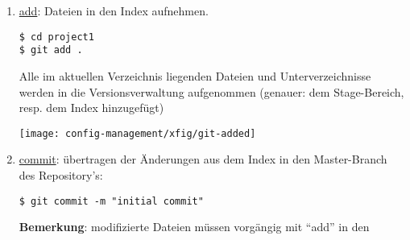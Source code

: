 \begin{enumerate}
Ein leeres, lokales Repository im aktuellen Verzeichnis einrichten:
  \begin{lstlisting}
$ cd /home/user/projects
$ git init project1
Initialized empty Git repository in /home/user/projects/project1/.git
  \end{lstlisting}
\begin{center}
\texttt{[image: config-management/git-repository-files]}
\end{center}
%
{\bfseries Bemerkung:} Um ein lokales Repository aus einem bereits existierenden
zu erzeugen, muss anstelle von ``init'' der Befehl ``clone'' verwendet
werden:
\begin{lstlisting}
$ git clone file:///var/git/project1.git
\end{lstlisting}
%
\newslide
\item \underline{add}: Dateien in den Index aufnehmen.
  \begin{lstlisting}
$ cd project1
$ git add .
  \end{lstlisting}
Alle im aktuellen Verzeichnis liegenden Dateien und Unterverzeichnisse
werden in die Versionsverwaltung aufgenommen (genauer: dem
Stage-Bereich, resp. dem Index hinzugefügt)
%
\newslide
\begin{center}
\texttt{[image: config-management/xfig/git-added]}
\end{center}
\newslide
\item \underline{commit}: übertragen der Änderungen aus dem Index in
  den Master-Branch des Repository's:
  \begin{lstlisting}
$ git commit -m "initial commit"
  \end{lstlisting}
{\bfseries Bemerkung}: modifizierte Dateien müssen vorgängig mit ``add'' in den

\end{enumerate}

